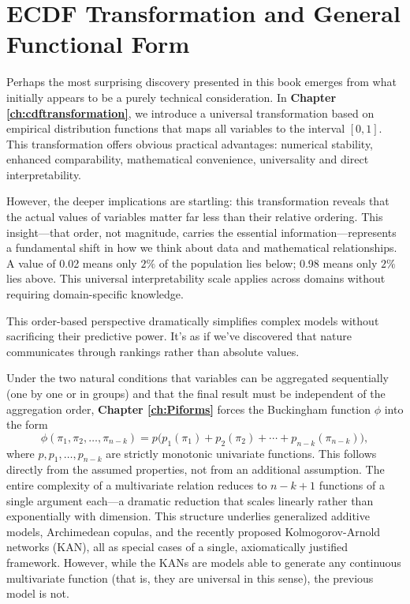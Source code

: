 \section{ECDF Transformation and General Functional Form}
Perhaps the most surprising discovery presented in this book emerges from what initially appears to be a purely technical consideration. In \textbf{Chapter \ref{ch:cdftransformation}}, we introduce a universal transformation based on empirical distribution functions that maps all variables to the interval $[0,1]$. This transformation offers obvious practical advantages: numerical stability, enhanced comparability, mathematical convenience, universality and direct interpretability.

However, the deeper implications are startling: this transformation reveals that the actual values of variables matter far less than their relative ordering. This insight—that order, not magnitude, carries the essential information—represents a fundamental shift in how we think about data and mathematical relationships. A value of 0.02 means only \(2\%\) of the population lies below; 0.98 means only \(2\%\) lies above. This universal interpretability scale applies across domains without requiring domain-specific knowledge.

This order-based perspective dramatically simplifies complex models without sacrificing their predictive power. It's as if we've discovered that nature communicates through rankings rather than absolute values.

Under the two natural conditions that variables can be aggregated sequentially (one by one or in groups) and that the final result must be independent of the aggregation order, \textbf{Chapter \ref{ch:Piforms}} forces the Buckingham function \(\phi\) into the form
\[
\phi(\pi_1,\pi_2,\ldots,\pi_{n-k}) = p\bigl(p_1(\pi_1)+p_2(\pi_2)+\cdots+p_{n-k}(\pi_{n-k})\bigr),
\]
where \(p,p_1,\ldots,p_{n-k}\) are strictly monotonic univariate functions. This follows directly from the assumed properties, not from an additional assumption. The entire complexity of a multivariate relation reduces to \(n-k+1\) functions of a single argument each—a dramatic reduction that scales linearly rather than exponentially with dimension. This structure underlies generalized additive models, Archimedean copulas, and the recently proposed Kolmogorov-Arnold networks (KAN), all as special cases of a single, axiomatically justified framework. However, while the KANs are models able to generate any continuous multivariate function (that is, they are universal in this sense), the previous model is not.

